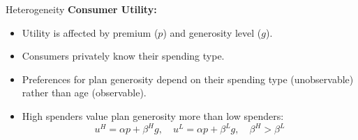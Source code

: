 \documentclass[professionalfonts, aspectratio=169]{beamer}
\begin{document}
\begin{frame}{Heterogeneity}
  \textbf{Consumer Utility:}
  \begin{itemize} \small
      \item Utility is affected by premium ($p$) and generosity level ($g$).
      \item Consumers privately know their spending type.
      \item Preferences for plan generosity depend on their spending type (unobservable) rather than age (observable).
      \item High spenders value plan generosity more than low spenders:
      $$ u^H = \alpha p + \beta^H g, \quad u^L = \alpha p + \beta^L g, \quad \beta^H > \beta^L $$
  \end{itemize}
\end{frame}
\end{document}
